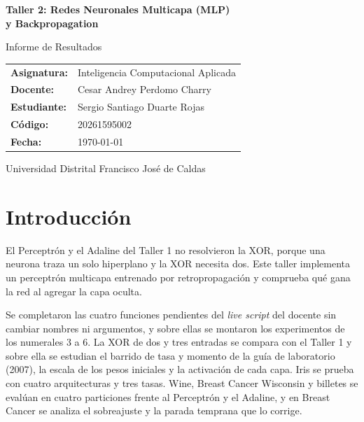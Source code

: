 \documentclass[11pt,letterpaper]{article}
\newcommand{\nombreEstudiante}{Sergio Santiago Duarte Rojas}
\newcommand{\codigoEstudiante}{20261595002}
\newcommand{\nombreDocente}{Cesar Andrey Perdomo Charry}
\newcommand{\nombreAsignatura}{Inteligencia Computacional Aplicada}
\newcommand{\fechaInforme}{\today}
\begin{document}
\begin{titlepage}
    \centering
    \vspace*{2cm}
    {\LARGE \bfseries Taller 2: Redes Neuronales Multicapa (MLP)\\ y Backpropagation\par}
    \vspace{0.5cm}
    {\large Informe de Resultados\par}
    \vspace{2cm}

    \begin{tabular}{ll}
        \textbf{Asignatura:} & \nombreAsignatura \\
        \textbf{Docente:}    & \nombreDocente \\
        \textbf{Estudiante:} & \nombreEstudiante \\
        \textbf{Código:}     & \codigoEstudiante \\
        \textbf{Fecha:}      & \fechaInforme \\
    \end{tabular}

    \vfill
    Universidad Distrital Francisco José de Caldas
\end{titlepage}

\tableofcontents
\newpage

\section{Introducción}

El Perceptrón y el Adaline del Taller 1 no resolvieron la XOR, porque una neurona traza un solo hiperplano y la XOR necesita dos. Este taller implementa un perceptrón multicapa entrenado por retropropagación y comprueba qué gana la red al agregar la capa oculta.

Se completaron las cuatro funciones pendientes del \textit{live script} del docente sin cambiar nombres ni argumentos, y sobre ellas se montaron los experimentos de los numerales 3 a 6. La XOR de dos y tres entradas se compara con el Taller 1 y sobre ella se estudian el barrido de tasa y momento de la guía de laboratorio (2007), la escala de los pesos iniciales y la activación de cada capa. Iris se prueba con cuatro arquitecturas y tres tasas. Wine, Breast Cancer Wisconsin y billetes se evalúan en cuatro particiones frente al Perceptrón y el Adaline, y en Breast Cancer se analiza el sobreajuste y la parada temprana que lo corrige.
\end{document}
